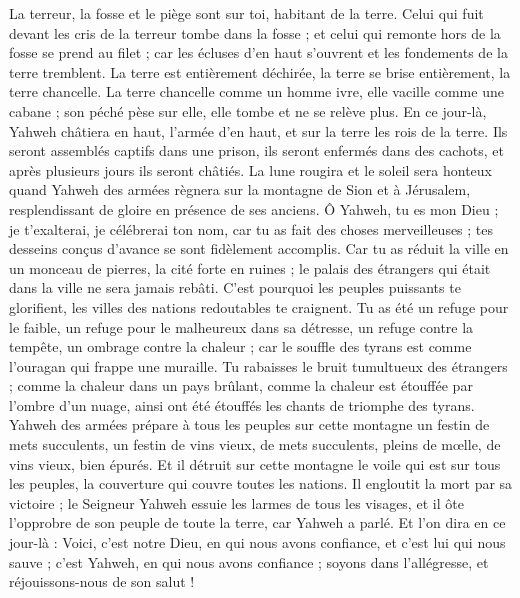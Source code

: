 \begin{multicols}{2}
La terreur, la fosse et le piège sont sur toi, habitant de la terre.
Celui qui fuit devant les cris de la terreur tombe dans la fosse ; et celui qui remonte hors de la fosse se prend au filet ; car les écluses d'en haut s'ouvrent et les fondements de la terre tremblent.
La terre est entièrement déchirée, la terre se brise entièrement, la terre chancelle.
La terre chancelle comme un homme ivre, elle vacille comme une cabane ; son péché pèse sur elle, elle tombe et ne se relève plus.
En ce jour-là, Yahweh châtiera en haut, l'armée d'en haut, et sur la terre les rois de la terre.
Ils seront assemblés captifs dans une prison, ils seront enfermés dans des cachots, et après plusieurs jours ils seront châtiés.
La lune rougira et le soleil sera honteux quand Yahweh des armées règnera sur la montagne de Sion et à Jérusalem, resplendissant de gloire en présence de ses anciens.
\VerseOne{}Ô Yahweh, tu es mon Dieu ; je t'exalterai, je célébrerai ton nom, car tu as fait des choses merveilleuses ; tes desseins conçus d'avance se sont fidèlement accomplis.
Car tu as réduit la ville en un monceau de pierres, la cité forte en ruines ; le palais des étrangers qui était dans la ville ne sera jamais rebâti.
C'est pourquoi les peuples puissants te glorifient, les villes des nations redoutables te craignent.
Tu as été un refuge pour le faible, un refuge pour le malheureux dans sa détresse, un refuge contre la tempête, un ombrage contre la chaleur ; car le souffle des tyrans est comme l'ouragan qui frappe une muraille.
Tu rabaisses le bruit tumultueux des étrangers ; comme la chaleur dans un pays brûlant, comme la chaleur est étouffée par l'ombre d'un nuage, ainsi ont été étouffés les chants de triomphe des tyrans.
Yahweh des armées prépare à tous les peuples sur cette montagne un festin de mets succulents, un festin de vins vieux, de mets succulents, pleins de mœlle, de vins vieux, bien épurés.
Et il détruit sur cette montagne le voile qui est sur tous les peuples, la couverture qui couvre toutes les nations.
Il engloutit la mort par sa victoire ; le Seigneur Yahweh essuie les larmes de tous les visages, et il ôte l'opprobre de son peuple de toute la terre, car Yahweh a parlé.
Et l'on dira en ce jour-là : Voici, c'est notre Dieu, en qui nous avons confiance, et c'est lui qui nous sauve ; c'est Yahweh, en qui nous avons confiance ; soyons dans l'allégresse, et réjouissons-nous de son salut !

\end{multicols}
